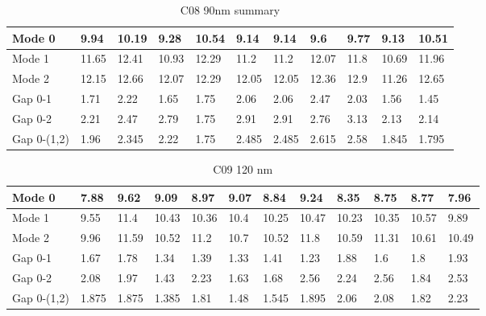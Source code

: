 \begin{table}[]
\centering
\begin{tabular}{|l|l|l|l|l|l|l|l|l|l|l|}
\hline
Mode 0 & 9.94 & 10.19 & 9.28 & 10.54 & 9.14 & 9.14 & 9.6 & 9.77 & 9.13 & 10.51 \\ \hline
Mode 1 & 11.65 & 12.41 & 10.93 & 12.29 & 11.2 & 11.2 & 12.07 & 11.8 & 10.69 & 11.96 \\ \hline
Mode 2 & 12.15 & 12.66 & 12.07 & 12.29 & 12.05 & 12.05 & 12.36 & 12.9 & 11.26 & 12.65 \\ \hline
Gap 0-1 & 1.71 & 2.22 & 1.65 & 1.75 & 2.06 & 2.06 & 2.47 & 2.03 & 1.56 & 1.45 \\ \hline
Gap 0-2 & 2.21 & 2.47 & 2.79 & 1.75 & 2.91 & 2.91 & 2.76 & 3.13 & 2.13 & 2.14 \\ \hline
Gap 0-(1,2) & 1.96 & 2.345 & 2.22 & 1.75 & 2.485 & 2.485 & 2.615 & 2.58 & 1.845 & 1.795 \\ \hline
\end{tabular}
\caption{C08 90nm summary}
\label{C08summary}
\end{table}



\begin{table}[]
\centering
\begin{tabular}{|l|l|l|l|l|l|l|l|l|l|l|l|}
\hline
Mode 0 & 7.88 & 9.62 & 9.09 & 8.97 & 9.07 & 8.84 & 9.24 & 8.35 & 8.75 & 8.77 & 7.96 \\ \hline
Mode 1 & 9.55 & 11.4 & 10.43 & 10.36 & 10.4 & 10.25 & 10.47 & 10.23 & 10.35 & 10.57 & 9.89 \\ \hline
Mode 2 & 9.96 & 11.59 & 10.52 & 11.2 & 10.7 & 10.52 & 11.8 & 10.59 & 11.31 & 10.61 & 10.49 \\ \hline
Gap 0-1 & 1.67 & 1.78 & 1.34 & 1.39 & 1.33 & 1.41 & 1.23 & 1.88 & 1.6 & 1.8 & 1.93 \\ \hline
Gap 0-2 & 2.08 & 1.97 & 1.43 & 2.23 & 1.63 & 1.68 & 2.56 & 2.24 & 2.56 & 1.84 & 2.53 \\ \hline
Gap 0-(1,2) & 1.875 & 1.875 & 1.385 & 1.81 & 1.48 & 1.545 & 1.895 & 2.06 & 2.08 & 1.82 & 2.23 \\ \hline
\end{tabular}
\caption{C09 120 nm}
\label{C09summary}
\end{table}



